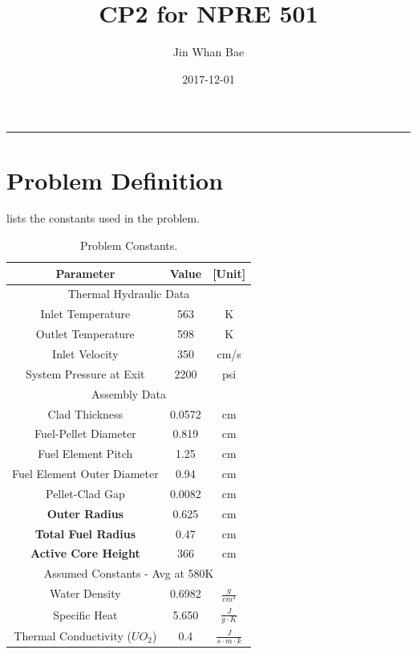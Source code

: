 \documentclass[12pt,letterpaper]{article}
\title{CP2 for NPRE 501}
\author{Jin Whan Bae}
\date{2017-12-01}
\begin{document}
	
	\maketitle
	\hrule
	\onehalfspacing
	\thispagestyle{empty}

\section*{Problem Definition}

 lists the constants used in the problem.


\begin{table}[h]
     \centering
    \begin{tabular}{ccc}
       \hline
       Parameter & Value & [Unit] \\
       \hline
       \multicolumn{3}{c}{Thermal Hydraulic Data}\\
       \hline
       Inlet Temperature & 563 & K \\
       Outlet Temperature & 598 & K \\
       Inlet Velocity & 350 & cm/s \\
       System Pressure at Exit & 2200 & psi \\
       \hline
       \multicolumn{3}{c}{Assembly Data} \\
       \hline
       Clad Thickness & 0.0572 & cm \\
       Fuel-Pellet Diameter & 0.819 & cm \\
       Fuel Element Pitch & 1.25 & cm \\
       Fuel Element Outer Diameter & 0.94& cm \\
       Pellet-Clad Gap & 0.0082 & cm \\
       \textbf{Outer Radius} & 0.625 & cm \\
       \textbf{Total Fuel Radius} & 0.47 & cm \\
       \textbf{Active Core Height} & 366 & cm \\
       \hline
       \multicolumn{3}{c}{Assumed Constants - Avg at 580K} \\
       \hline
       Water Density & 0.6982 & $\frac{g}{cm^3}$ \\
       Specific Heat & 5.650 & $\frac{J}{g\cdot K}$ \\
       Thermal Conductivity ($UO_2$) & 0.4 \cite{ronchi_thermal_1999} & $\frac{J}{s\cdot m\cdot k}$ \\       
       \hline
    \end{tabular}
    \caption {Problem Constants.}
    \label{tab:constants}
\end{table}
\end{document}
